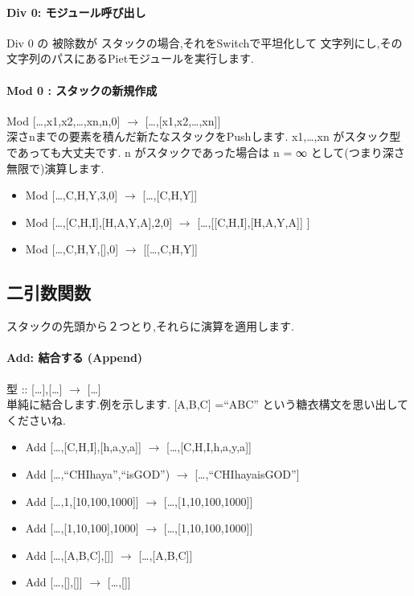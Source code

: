 \paragraph{Div 0: モジュール呼び出し}

Div 0 の 被除数が スタックの場合,それをSwitchで平坦化して
文字列にし,その文字列のパスにあるPietモジュールを実行します.

\paragraph{Mod 0 : スタックの新規作成}

Mod {[}\ldots{},x1,x2,\ldots{},xn,n,0{]} $\to$
{[}\ldots{},{[}x1,x2,\ldots{},xn{]}{]}\\深さnまでの要素を積んだ新たなスタックをPushします.
x1,\ldots{},xn がスタック型であっても大丈夫です. n
がスタックであった場合は n = ∞ として(つまり深さ無限で)演算します.

\begin{itemize}
\item
  Mod {[}\ldots{},C,H,Y,3,0{]} $\to$
  {[}\ldots{},{[}C,H,Y{]}{]}
\item
  Mod {[}\ldots{},{[}C,H,I{]},{[}H,A,Y,A{]},2,0{]} $\to$
  {[}\ldots{},{[}{[}C,H,I{]},{[}H,A,Y,A{]}{]} {]}
\item
  Mod {[}\ldots{},C,H,Y,{[}{]},0{]} $\to$
  {[}{[}\ldots{},C,H,Y{]}{]}
\end{itemize}

\subsection{二引数関数}

スタックの先頭から２つとり,それらに演算を適用します.

\paragraph{Add: 結合する (Append)}

型 :: {[}\ldots{}{]},{[}\ldots{}{]} $\to$
{[}\ldots{}{]}\\単純に結合します.例を示します. {[}A,B,C{]} =``ABC''
という糖衣構文を思い出してくださいね.

\begin{itemize}
\item
  Add {[}\ldots{},{[}C,H,I{]},{[}h,a,y,a{]}{]} $\to$
  {[}\ldots{},{[}C,H,I,h,a,y,a{]}{]}
\item
  Add {[}\ldots{},``CHIhaya'',``isGOD'') $\to$
  {[}\ldots{},``CHIhayaisGOD''{]}
\item
  Add {[}\ldots{},1,{[}10,100,1000{]}{]} $\to$
  {[}\ldots{},{[}1,10,100,1000{]}{]}
\item
  Add {[}\ldots{},{[}1,10,100{]},1000{]} $\to$
  {[}\ldots{},{[}1,10,100,1000{]}{]}
\item
  Add {[}\ldots{},{[}A,B,C{]},{[}{]}{]} $\to$
  {[}\ldots{},{[}A,B,C{]}{]}
\item
  Add {[}\ldots{},{[}{]},{[}{]}{]} $\to$ {[}\ldots{},{[}{]}{]}
\end{itemize}

